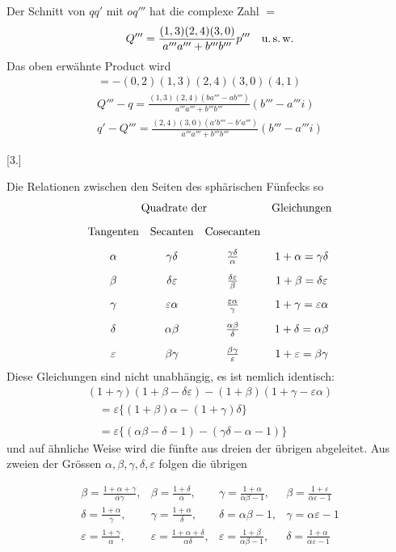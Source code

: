 Der Schnitt von $qq'$ mit $oq'''$ hat die complexe Zahl $=$
\[
Q'''=\frac{(1,3)(2,4)(3,0)}{a'''a'''+b'''b'''}p''' \quad\text{u.\,s.\,w.}
\]
Das oben erwähnte Product wird
\[
\begin{gathered}  =-(0,2)(1,3)(2,4)(3,0)(4,1)\\[9pt] Q'''-q=\frac{(1,3)(2,4)(ba'''-ab''')}{a'''a'''+b'''b'''} (b'''-a'''i)\\[9pt] q'-Q'''=\frac{(2,4)(3,0)(a'b'''-b'a''')}{a'''a'''+b'''b'''} (b'''-a'''i) \end{gathered}
\]
\par\medskip{}\centerline{[3.]}\nobreak\smallskip
Die Relationen zwischen den Seiten des sphärischen Fünfecks so
\begingroup\small\setlength{\arraycolsep}{3pt}\[
\begin{array}{cccc} \multicolumn{3}{c}{\text{Quadrate der}}&\text{Gleichungen}\\[9pt] \text{Tangenten}&\text{Secanten}&\text{Cosecanten}&\\[9pt] \alpha&\gamma\delta&\frac{\gamma\delta}{\alpha}&1+\alpha=\gamma\delta\\[9pt] \beta&\delta\varepsilon&\frac{\delta\varepsilon}{\beta}&1+\beta=\delta\varepsilon\\[9pt] \gamma&\varepsilon\alpha&\frac{\varepsilon\alpha}{\gamma}&1+\gamma=\varepsilon\alpha\\[9pt] \delta&\alpha\beta&\frac{\alpha\beta}{\delta}&1+\delta=\alpha\beta\\[9pt] \varepsilon&\beta\gamma&\frac{\beta\gamma}{\varepsilon}&1+\varepsilon=\beta\gamma \end{array}
\]\endgroup
Diese Gleichungen sind nicht unabhängig, es ist nemlich identisch:
\[
\begin{gathered} (1+\gamma)(1+\beta-\delta\varepsilon) -(1+\beta)(1+\gamma-\varepsilon\alpha) \\[9pt]\quad{}=\varepsilon\{(1+\beta)\alpha-(1+\gamma)\delta\}\\[9pt] \\[9pt]\quad{}=\varepsilon\{(\alpha\beta-\delta-1)-(\gamma\delta-\alpha-1)\} \end{gathered}
\]
und auf ähnliche Weise wird die fünfte aus dreien der übrigen abgeleitet.
Aus zweien der Grössen $\alpha,\beta,\gamma,\delta,\varepsilon$ folgen die übrigen
\par\nopagebreak%
\begingroup\small\setlength{\arraycolsep}{2pt}\[
\begin{array}{llll} \beta=\frac{1+\alpha+\gamma}{\alpha\gamma}, &\beta=\frac{1+\delta}{\alpha}, &\gamma=\frac{1+\alpha}{\alpha\beta-1}, &\beta=\frac{1+\varepsilon}{\alpha\varepsilon-1}\\[9pt] \delta=\frac{1+\alpha}{\gamma}, &\gamma=\frac{1+\alpha}{\delta}, &\delta=\alpha\beta-1, &\gamma=\alpha\varepsilon-1\\[9pt] \varepsilon=\frac{1+\gamma}{\alpha}, &\varepsilon=\frac{1+\alpha+\delta}{\alpha\delta}, &\varepsilon=\frac{1+\beta}{\alpha\beta-1}, &\delta=\frac{1+\alpha}{\alpha\varepsilon-1} \end{array}
\]\endgroup\par%

